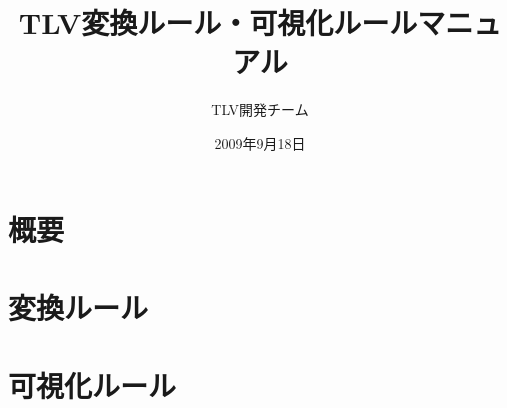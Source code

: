 \documentclass[a4paper,12pt]{jreport}
\begin{document}
\title{TLV変換ルール・可視化ルールマニュアル}
\date{2009年9月18日}
\author{TLV開発チーム}
\maketitle
\pagestyle{plain} 
\setcounter{page}{1}
\tableofcontents

\pagestyle{plain} 
\setcounter{page}{1}

\chapter{概要}


\chapter{変換ルール}


\chapter{可視化ルール}



\end{document}
